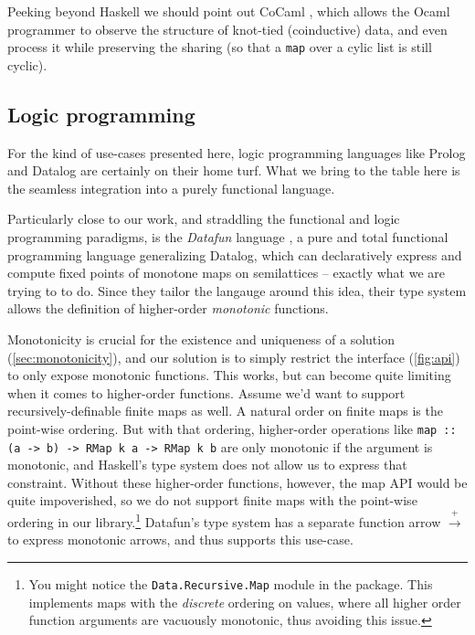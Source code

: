 \documentclass[manuscript,screen,acmsmall]{acmart}
\begin{document}
Peeking beyond Haskell we should point out CoCaml \citep{cocaml}, which allows the Ocaml programmer to observe the structure of knot-tied (coinductive) data, and even process it while preserving the sharing (so that a \verb|map| over a cylic list is still cyclic).


\subsection{Logic programming}

For the kind of use-cases presented here, logic programming languages like Prolog and Datalog are certainly on their home turf. What we bring to the table here is the seamless integration into a purely functional language.

Particularly close to our work, and straddling the functional and logic programming paradigms, is the \emph{Datafun} language \citep{datafun}, a pure and total functional programming language generalizing Datalog, which can declaratively express and compute fixed points of monotone maps on semilattices -- exactly what we are trying to to do. Since they tailor the langauge around this idea, their type system allows the definition of higher-order \emph{monotonic} functions.

Monotonicity is crucial for the existence and uniqueness of a solution (\cref{sec:monotonicity}), and our solution is to simply restrict the interface (\cref{fig:api}) to only expose monotonic functions. This works, but can become quite limiting when it comes to higher-order functions. Assume we'd want to support recursively-definable finite maps as well. A natural order on finite maps is the point-wise ordering. But with that ordering, higher-order operations like \verb|map :: (a -> b) -> RMap k a -> RMap k b| are only monotonic if the argument is monotonic, and Haskell's type system does not allow us to express that constraint. Without these higher-order functions, however, the map API would be quite impoverished, so we do not support finite maps with the point-wise ordering in our library.\footnote{You might notice the \texttt{Data.Recursive.Map} module in the package. This implements maps with the \emph{discrete} ordering on values, where all higher order function arguments are vacuously monotonic, thus avoiding this issue.} Datafun's type system has a separate function arrow $\xrightarrow{+}$ to express monotonic arrows, and thus supports this use-case.




\end{document}

